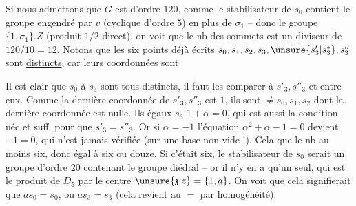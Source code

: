 Si nous admettons que $G$ est  d'ordre $120$, comme le stabilisateur de $s_0$ contient le groupe  engendré par $v$ (cyclique d'ordre $5$) en plus de $\sigma_1$ -- donc le groupe  $\{1,\sigma_1\}.Z$ (produit $1/2$ direct), on voit que le nb des sommets est un diviseur de $120/10=12$. Notons que les six points déjà écrits $s_0,s_1,s_2,s_3,\unsure{s'_3|s_3^*},s''_3$ sont \uline{distincts}, car leurs coordonnées sont

 Il est clair que $s_0$ à $s_3$ sont tous distincts, il faut  les comparer à $s'_3,s''_3$ et  entre eux. Comme la dernière coordonnée de $s'_3,s''_3$  est $1$, ils sont $\ne s_0,s_1,s_2$ dont la dernière coordonnée est nulle. Ils  égaux  $s_3$  $1+\alpha=0$, qui est  aussi la condition néc et suff. pour que $s'_3=s''_3$. Or  si $\alpha=-1$
l'équation $\alpha^2+\alpha-1=0$ devient $-1=0$, qui n'est jamais vérifiée (sur une base non vide !). Cela  que le nb   au moins six, donc égal à six ou douze. Si c'était  six, le stabilisateur de $s_0$ serait un groupe d'ordre $20$ contenant le groupe diédral  -- or il n'y en a qu'un seul, qui est le produit de $D_5$ par le centre $\unsure{\mathfrak{z}|z}=\{1,\underline{a}\}$. On voit que cela signifierait que $as_0=s_0$, ou $as_3=s_3$ (cela revient au $=$ par homogénéité).

